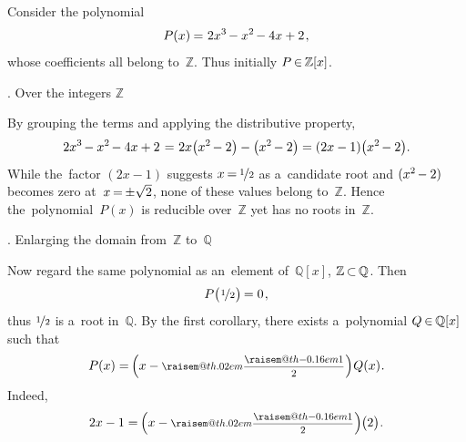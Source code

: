 \documentclass[11pt, twoside]{book}
\makeatletter
\newcommand\fex{\hspace{.2ex}} %
\newcommand\nfex{\hspace{-0.2ex}} %
\newcommand\thex{\hspace{.1ex}} %
\newcommand\nthex{\hspace{-0.1ex}} %
\newcommand{\textsb}[1]{{\fontseries{sb}\selectfont #1}}
\newcommand\cin{\nfex\in\nfex}
\newcommand\csubset{\nfex\subset\nfex}
\newcommand\ceq{\nfex=\nfex}
\newcommand{\raisemath}[1]{\mathpalette{\raisem@th{#1}}}
\newcommand{\raisem@th}[3]{\raisebox{#1}{$#2#3$}}
\newcommand\onehalf{\raisemath{.02em}{\frac{\raisemath{-0.16em}{1}}{2}}}
\newcommand\smalldisplaystyleonehalf{\scalebox{.8}{$\displaystyle \onehalf$}\thex}
\makeatother
\begin{document}
\vspace{.5em}

Consider the polynomial
%
\vspace{-0.25em}
\begin{equation*}
P(x) \nthex = \thex 2x^3 \nfex - x^2 \nfex - 4x + 2
\fex ,
\vspace{-0.25em}
\end{equation*}
%
whose coefficients all belong to~$\mathbb{Z}$.
Thus initially
${P \cin \mathbb{Z}[x]}$.

\vspace{.5em}

\noindent
\textsb{1. Over the integers $\mathbb{Z}$}

By grouping the terms and applying the distributive property,
%
\vspace{-0.2em}
\begin{equation*}
2x^3 \nfex - x^2 \nfex - 4x + 2
\fex = \thex
2x \bigl(x^2 \nfex - 2\bigr) - \bigl(x^2 \nfex - 2\bigr)
= (2x - 1) \bigl(x^2 \nfex - 2\bigr)
.
\vspace{-0.2em}
\end{equation*}
%
While the~factor ${(2x - 1)}$ suggests ${x \ceq \nicefrac{1}{2}}$ as a~candidate root
and ${(x^2 \nfex - 2)}$ becomes zero at~${x \ceq \pm \sqrt{2}}$, none of these values belong to~$\mathbb{Z}$.
Hence the~polynomial~$P(x)$ is reducible over~$\mathbb{Z}$ yet has no roots in~$\mathbb{Z}$.

\vspace{.5em}

\noindent
\textsb{2. Enlarging the domain from~$\mathbb{Z}$ to~$\mathbb{Q}$}

Now regard the same polynomial as an~element of~$\mathbb{Q}[x]$, ${\mathbb{Z} \csubset \mathbb{Q}}$.
Then
%
\vspace{-0.5em}
\begin{equation*}
P \bigl( \thex \nicefrac{1}{2} \thex \bigr) \nfex = 0
\fex ,
\vspace{-0.5em}
\end{equation*}
%
thus ${\nicefrac{1}{2}}$ is a~root in~$\mathbb{Q}$.
By the first corollary,
there exists a~polynomial ${Q \cin \mathbb{Q}[x]}$
such that
%
\nopagebreak\vspace{-0.25em}
\begin{equation*}
P(x) = \nfex \Bigl( x - \smalldisplaystyleonehalf \Bigr) \thex Q(x)
\thex .
\end{equation*}
%
Indeed,
%
\vspace{-0.75em}
\begin{equation*}
2x - 1 = \nfex \Bigl( x - \smalldisplaystyleonehalf \Bigr) \nthex \bigl(2\bigr)
\thex .
\end{equation*}
\end{document}
